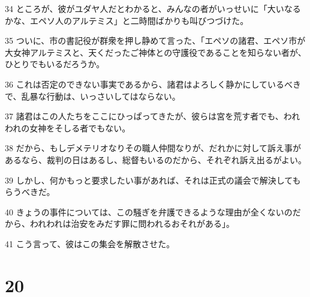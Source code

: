 \par 34 ところが、彼がユダヤ人だとわかると、みんなの者がいっせいに「大いなるかな、エペソ人のアルテミス」と二時間ばかりも叫びつづけた。
\par 35 ついに、市の書記役が群衆を押し静めて言った、「エペソの諸君、エペソ市が大女神アルテミスと、天くだったご神体との守護役であることを知らない者が、ひとりでもいるだろうか。
\par 36 これは否定のできない事実であるから、諸君はよろしく静かにしているべきで、乱暴な行動は、いっさいしてはならない。
\par 37 諸君はこの人たちをここにひっぱってきたが、彼らは宮を荒す者でも、われわれの女神をそしる者でもない。
\par 38 だから、もしデメテリオなりその職人仲間なりが、だれかに対して訴え事があるなら、裁判の日はあるし、総督もいるのだから、それぞれ訴え出るがよい。
\par 39 しかし、何かもっと要求したい事があれば、それは正式の議会で解決してもらうべきだ。
\par 40 きょうの事件については、この騒ぎを弁護できるような理由が全くないのだから、われわれは治安をみだす罪に問われるおそれがある」。
\par 41 こう言って、彼はこの集会を解散させた。

\chapter{20}

